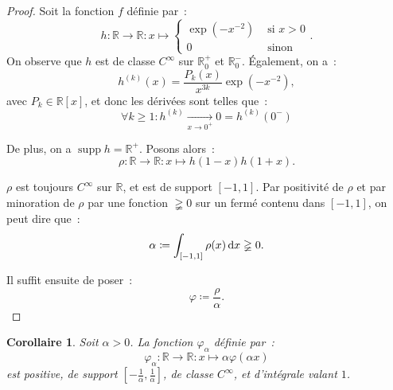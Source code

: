 \documentclass{report}
\newtheorem{cor}[thm]{Corollaire}
\theoremstyle{definition}
\theoremstyle{remark}
\numberwithin{equation}{section}
\newcommand{\R}{\mathbb R}
\newcommand{\Rp}{\R^{+}}
\newcommand{\Rm}{\R^{-}}
\DeclareMathOperator{\supp}{supp}
\begin{document}
			\begin{proof} Soit la fonction $f$ définie par~:
			\begin{equation}
				h : \R \to \R : x \mapsto \begin{cases}\exp\left(-x^{-2}\right) &\text{ si } x > 0 \\0 &\text{ sinon }\end{cases}.
			\end{equation}
			On observe que $h$ est de classe $C^\infty$ sur $\Rp_0$ et $\Rm_0$. Également, on a~:
			\begin{equation}
				h^{(k)}(x) = \frac {P_k(x)}{x^{3k}}\exp(-x^{-2}),
			\end{equation}
			avec $P_k \in \R[x]$, et donc les dérivées sont telles que~:
			\begin{equation}
				\forall k \geq 1 : h^{(k)} \xrightarrow[x \to 0^+]{} 0 = h^{(k)}(0^-)
			\end{equation}

			De plus, on a $\supp h = \Rp$. Posons alors~:
			\begin{equation}
				\rho : \R \to \R : x \mapsto h(1-x)h(1+x).
			\end{equation}

			$\rho$ est toujours $C^\infty$ sur $\R$, et est de support $[-1, 1]$. Par positivité de $\rho$ et par minoration de $\rho$ par une fonction $\gneqq 0$
			sur un fermé contenu dans $[-1, 1]$, on peut dire que~:
			\begin{equation}
				\alpha \coloneqq \int_{[-1, 1]}\rho(x)\dif x \gneqq 0.
			\end{equation}

			Il suffit ensuite de poser~:
			\begin{equation}
				\varphi \coloneqq \frac \rho\alpha.
			\end{equation}
			\end{proof}

			\begin{cor}\label{cor:varphi_k}Soit $\alpha > 0$. La fonction $\varphi_\alpha$ définie par~:
			\begin{equation}
				\varphi_\alpha : \R \to \R : x \mapsto \alpha\varphi(\alpha x)
			\end{equation}
			est positive, de support $\left[-\frac 1\alpha, \frac 1\alpha\right]$, de classe $C^\infty$, et d'intégrale valant $1$.
			\end{cor}
\end{document}
